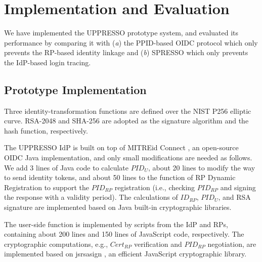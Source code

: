 \section{Implementation and Evaluation}
\label{sec:implementation}
We have implemented the UPPRESSO prototype system, and evaluated its performance
 by comparing it with (\emph{a}) the PPID-based OIDC protocol
    which only prevents the RP-based identity linkage
     and (\emph{b}) SPRESSO which only prevents the IdP-based login tracing.

\subsection{Prototype Implementation}
Three identity-transformation functions are defined over
        the NIST P256 elliptic curve.
RSA-2048 and SHA-256 are adopted as the signature algorithm and the hash function, respectively.

The UPPRESSO IdP is built on top of MITREid Connect \cite{MITREid},
    an open-source OIDC Java implementation, %
    and only small modifications are needed as follows.
We add 3 lines of Java code to calculate $PID_U$,
     about 20 lines to modify the way to send identity tokens,
    and about 50 lines to the function of RP Dynamic Registration to support the $PID_{RP}$ registration
            (i.e., checking $PID_{RP}$ and signing the response with a validity period).
The calculations of $ID_{RP}$, $PID_U$, and RSA signature are implemented based on Java built-in cryptographic libraries. %

The user-side function is implemented by scripts from the IdP and RPs,
     containing about 200 lines and 150 lines of JavaScript code, respectively.
The cryptographic computations, e.g., $Cert_{RP}$ verification and $PID_{RP}$ negotiation, are implemented based on jsrsasign \cite{jsrsasign}, an efficient JavaScript cryptographic library.

